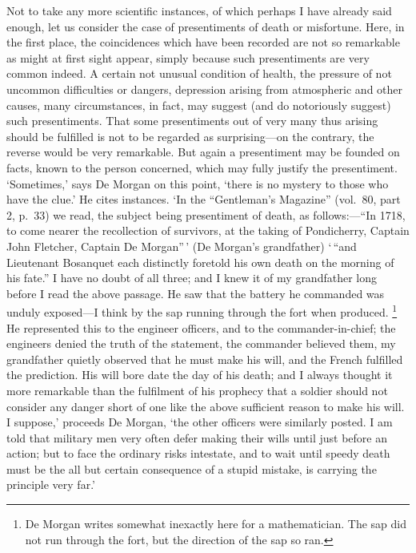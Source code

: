 \documentclass[letterpaper,12pt,oneside,openany]{memoir}
\begin{document}
Not to take any more scientific instances, of which
perhaps I have already said enough, let us consider
the case of presentiments of death or misfortune.
Here, in the first place, the coincidences which have
been recorded are not so remarkable as might at first
sight appear, simply because such presentiments are
very common indeed. A certain not unusual condition
of health, the pressure of not uncommon difficulties or
dangers, depression arising from atmospheric and other
causes, many circumstances, in fact, may suggest (and
do notoriously suggest) such presentiments. That
some presentiments out of very many thus arising
should be fulfilled is not to be regarded as surprising---on
the contrary, the reverse would be very remarkable.
But again a presentiment may be founded on facts,
known to the person concerned, which may fully justify
the presentiment. `Sometimes,' says De Morgan on
this point, `there is no mystery to those who have
the clue.' He cites instances. `In the ``Gentleman's
Magazine'' (vol.~80, part 2, p.~33) we read, the subject
being presentiment of death, as follows:---``In 1718,
to come nearer the recollection of survivors, at the
taking of Pondicherry, Captain John Fletcher, Captain
De Morgan''\,' (De Morgan's grandfather) `\,``and
Lieutenant Bosanquet each distinctly foretold his own
death on the morning of his fate.'' I have no doubt of
all three; and I knew it of my grandfather long before
I read the above passage. He saw that the battery he
commanded was unduly exposed---I think by the sap
running through the fort when produced.%
%
\footnote{De Morgan writes somewhat inexactly here for a mathematician.
The sap did not run through the fort, but the direction of
the sap so ran.}
%
He represented
this to the engineer officers, and to the
commander-in-chief; the engineers denied the truth
of the statement, the commander believed them, my
grandfather quietly observed that he must make his
will, and the French fulfilled the prediction. His will
bore date the day of his death; and I always thought it
more remarkable than the fulfilment of his prophecy
that a soldier should not consider any danger short of
one like the above sufficient reason to make his will.
I suppose,' proceeds De Morgan, `the other officers
were similarly posted. I am told that military men
very often defer making their wills until just before an
action; but to face the ordinary risks intestate, and to
wait until speedy death must be the all but certain
consequence of a stupid mistake, is carrying the principle
very far.'
\end{document}
